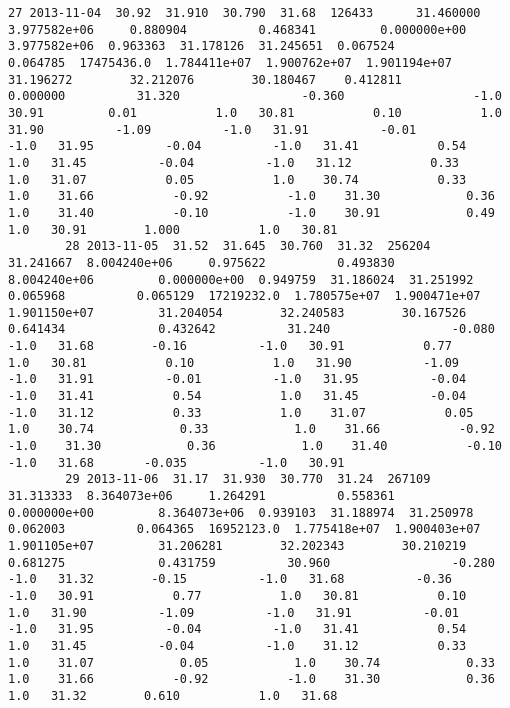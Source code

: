 \documentclass[11pt]{article}
\begin{document}
\begin{Verbatim}[commandchars=\\\{\}]
        27 2013-11-04  30.92  31.910  30.790  31.68  126433      31.460000  3.977582e+06     0.880904          0.468341         0.000000e+00         3.977582e+06  0.963363  31.178126  31.245651  0.067524          0.064785  17475436.0  1.784411e+07  1.900762e+07  1.901194e+07         31.196272        32.212076        30.180467    0.412811             0.000000          31.320                 -0.360                  -1.0   30.91         0.01           1.0   30.81           0.10           1.0   31.90          -1.09          -1.0   31.91          -0.01          -1.0   31.95          -0.04          -1.0   31.41           0.54           1.0   31.45          -0.04          -1.0   31.12           0.33           1.0   31.07           0.05           1.0    30.74           0.33            1.0    31.66           -0.92           -1.0    31.30            0.36            1.0    31.40           -0.10           -1.0    30.91            0.49            1.0   30.91        1.000           1.0   30.81   
        28 2013-11-05  31.52  31.645  30.760  31.32  256204      31.241667  8.004240e+06     0.975622          0.493830         8.004240e+06         0.000000e+00  0.949759  31.186024  31.251992  0.065968          0.065129  17219232.0  1.780575e+07  1.900471e+07  1.901150e+07         31.204054        32.240583        30.167526    0.641434             0.432642          31.240                 -0.080                  -1.0   31.68        -0.16          -1.0   30.91           0.77           1.0   30.81           0.10           1.0   31.90          -1.09          -1.0   31.91          -0.01          -1.0   31.95          -0.04          -1.0   31.41           0.54           1.0   31.45          -0.04          -1.0   31.12           0.33           1.0    31.07           0.05            1.0    30.74            0.33            1.0    31.66           -0.92           -1.0    31.30            0.36            1.0    31.40           -0.10           -1.0   31.68       -0.035          -1.0   30.91   
        29 2013-11-06  31.17  31.930  30.770  31.24  267109      31.313333  8.364073e+06     1.264291          0.558361         0.000000e+00         8.364073e+06  0.939103  31.188974  31.250978  0.062003          0.064365  16952123.0  1.775418e+07  1.900403e+07  1.901105e+07         31.206281        32.202343        30.210219    0.681275             0.431759          30.960                 -0.280                  -1.0   31.32        -0.15          -1.0   31.68          -0.36          -1.0   30.91           0.77           1.0   30.81           0.10           1.0   31.90          -1.09          -1.0   31.91          -0.01          -1.0   31.95          -0.04          -1.0   31.41           0.54           1.0   31.45          -0.04          -1.0    31.12           0.33            1.0    31.07            0.05            1.0    30.74            0.33            1.0    31.66           -0.92           -1.0    31.30            0.36            1.0   31.32        0.610           1.0   31.68   

\end{Verbatim}
\end{document}
